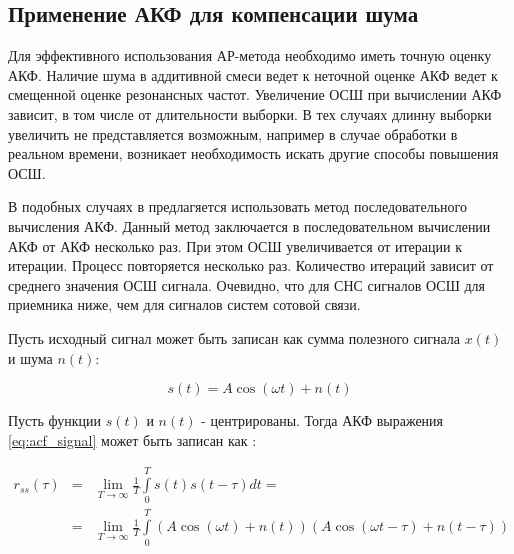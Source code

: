 \subsection{Применение АКФ для компенсации шума}

Для эффективного использования АР-метода необходимо иметь точную оценку АКФ. Наличие шума в аддитивной смеси ведет к неточной
оценке АКФ ведет к смещенной оценке резонансных частот. Увеличение ОСШ при вычислении АКФ зависит, в том числе от длительности
выборки. В тех случаях длинну выборки увеличить не представляется возможным, например в случае обработки в реальном времени,
возникает необходимость искать другие способы повышения ОСШ.

В подобных случаях в \cite{ostanin_akf} предлагяется использовать метод последовательного вычисления АКФ. Данный метод
заключается в последовательном вычислении АКФ от АКФ несколько раз. При этом ОСШ увеличивается от итерации к итерации.
Процесс повторяется несколько раз. Количество итераций зависит от среднего значения ОСШ сигнала. Очевидно, что
для СНС сигналов ОСШ для приемника ниже, чем для сигналов систем сотовой связи.

Пусть исходный сигнал может быть записан как сумма полезного сигнала ${x(t)}$ и шума ${n(t)}$:
\begin{center}
\begin{equation}
	\label{eq:acf_signal}
	s(t) = A \cos{(\omega t)} + n(t)
\end{equation}
\end{center}

Пусть функции ${s(t)}$ и ${n(t)}$ - центрированы. Тогда АКФ выражения \ref{eq:acf_signal} может быть записан как \cite{book_max}:
\begin{center}
\begin{eqnarray}
	\label{eq:acf_rss_signal}
	r_{ss}(\tau)	& = & \lim_{T \to \infty} \frac{1}{T} \int \limits_0^T s(t)s(t-\tau)dt = \nonumber \\
			& = & \lim_{T \to \infty} \frac{1}{T} \int \limits_0^T (A \cos{(\omega t)} + n(t))(A \cos{(\omega t - \tau)} + n(t - \tau))
\end{eqnarray}
\end{center}

